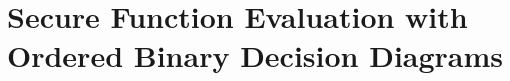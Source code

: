 \newenvironment{boxfig}[2]{\begin{figure}[#1]\fbox{\begin{minipage}{0.97\linewidth}
                        \vspace{0.2em}
                        \makebox[0.02\linewidth]{}
                        \begin{minipage}{0.94\linewidth}
            {\small{
                        #2 }}
                        \end{minipage}
                        \vspace{0.2em}
                        \end{minipage}}}{\end{figure}}

\newenvironment{boxfig*}[2]{\begin{figure*}[#1]\fbox{\begin{minipage}{0.97\linewidth}
                        \vspace{0.2em}
                        \makebox[0.02\linewidth]{}
                        \begin{minipage}{0.94\linewidth}
            {\small{
                        #2 }}
                        \end{minipage}
                        \vspace{0.2em}
                        \end{minipage}}}{\end{figure*}}


\newcommand{\alg}[1]{\ensuremath{\mathsf{#1}}}

\newcommand{\binset}{\{0,1\}}
\newcommand{\rfrom}{\ensuremath{\stackrel{\mathrm{R}}{\gets}}}
\newcommand{\from}{\ensuremath{{\gets}}}

\chapter{Secure Function Evaluation with Ordered Binary Decision Diagrams}
\label{chapter:obdd}





%

\begin{comment}
 


\appendix


\end{comment}
